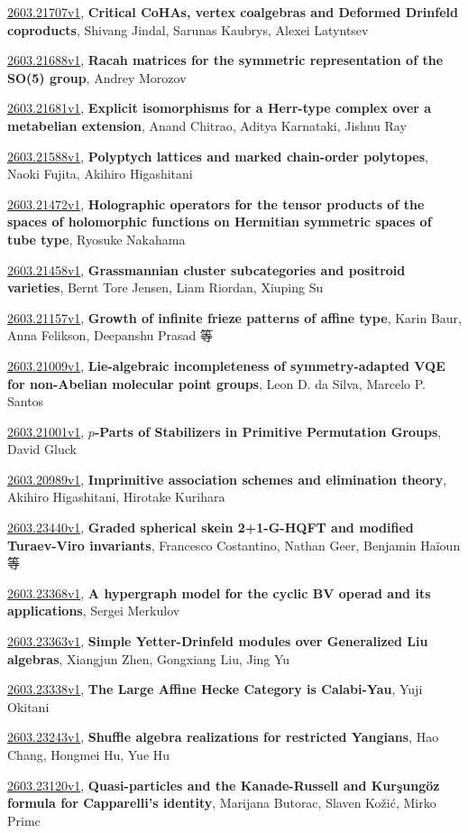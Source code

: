 \documentclass[9pt, a4paper]{article}
\theoremstyle{plain}
\theoremstyle{definition}
\theoremstyle{remark}
\newcommand{\arxiv}[3]{\href{https://arxiv.org/abs/#1}{#1}, \textbf{\textcolor{arxivblue}{#2}}, #3}
\begin{document}
\arxiv{2603.21707v1}{Critical CoHAs, vertex coalgebras and Deformed Drinfeld coproducts}{Shivang Jindal, Sarunas Kaubrys, Alexei Latyntsev}

\arxiv{2603.21688v1}{Racah matrices for the symmetric representation of the SO(5) group}{Andrey Morozov}

\arxiv{2603.21681v1}{Explicit isomorphisms for a Herr-type complex over a metabelian extension}{Anand Chitrao, Aditya Karnataki, Jishnu Ray}

\arxiv{2603.21588v1}{Polyptych lattices and marked chain-order polytopes}{Naoki Fujita, Akihiro Higashitani}

\arxiv{2603.21472v1}{Holographic operators for the tensor products of the spaces of holomorphic functions on Hermitian symmetric spaces of tube type}{Ryosuke Nakahama}

\arxiv{2603.21458v1}{Grassmannian cluster subcategories and positroid varieties}{Bernt Tore Jensen, Liam Riordan, Xiuping Su}

\arxiv{2603.21157v1}{Growth of infinite frieze patterns of affine type}{Karin Baur, Anna Felikson, Deepanshu Prasad 等}

\arxiv{2603.21009v1}{Lie-algebraic incompleteness of symmetry-adapted VQE for non-Abelian molecular point groups}{Leon D. da Silva, Marcelo P. Santos}

\arxiv{2603.21001v1}{$p$-Parts of Stabilizers in Primitive Permutation Groups}{David Gluck}

\arxiv{2603.20989v1}{Imprimitive association schemes and elimination theory}{Akihiro Higashitani, Hirotake Kurihara}

\arxiv{2603.23440v1}{Graded spherical skein 2+1-G-HQFT and modified Turaev-Viro invariants}{Francesco Costantino, Nathan Geer, Benjamin Haïoun 等}

\arxiv{2603.23368v1}{A hypergraph model for the cyclic BV operad and its applications}{Sergei Merkulov}

\arxiv{2603.23363v1}{Simple Yetter-Drinfeld modules over Generalized Liu algebras}{Xiangjun Zhen, Gongxiang Liu, Jing Yu}

\arxiv{2603.23338v1}{The Large Affine Hecke Category is Calabi-Yau}{Yuji Okitani}

\arxiv{2603.23243v1}{Shuffle algebra realizations for restricted Yangians}{Hao Chang, Hongmei Hu, Yue Hu}

\arxiv{2603.23120v1}{Quasi-particles and the Kanade-Russell and Kurşungöz formula for Capparelli's identity}{Marijana Butorac, Slaven Kožić, Mirko Primc}
\end{document}
